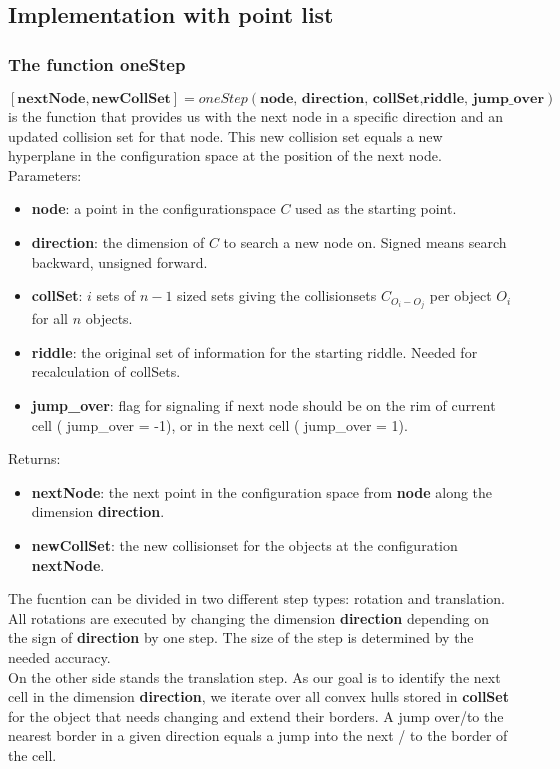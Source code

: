 \subsection{Implementation with point list}
\subsubsection{The function oneStep}
$[\textbf{nextNode}, \textbf{newCollSet} ]=oneStep(\textbf{node, direction, collSet,riddle, jump\_over})$ is the function that provides us with the next node in a specific direction and an updated collision set for that node. This new collision set equals a new hyperplane in the configuration space at the position of the next node.\\
Parameters:
\begin{itemize}
\item \textbf{node}: a point in the configurationspace $C$ used as the starting point.
\item \textbf{direction}: the dimension of $C$ to search a new node on. Signed means search backward, unsigned forward. 
\item \textbf{collSet}: $i$ sets of $n-1$ sized sets giving the collisionsets $C_{O_i-O_j}$ per object $O_i$ for all $n$ objects.
\item \textbf{riddle}: the original set of information for the starting riddle. Needed for recalculation of collSets.
\item \textbf{jump\_over}: flag for signaling if next node should be on the rim of current cell ( jump\_over = -1), or in the next cell ( jump\_over = 1).
\end{itemize}
Returns:
\begin{itemize}
\item \textbf{nextNode}: the next point in the configuration space from \textbf{node} along the dimension \textbf{direction}.
\item \textbf{newCollSet}: the new collisionset for the objects at the configuration \textbf{nextNode}.
\end{itemize}
The fucntion can be divided in two different step types: rotation and translation. \\
All rotations are executed by changing the dimension \textbf{direction}  depending on the sign of \textbf{direction} by one step. The size of the step is determined by the needed accuracy. \\
On the other side stands the translation step. As our goal is to identify the next cell in the dimension \textbf{direction}, we iterate over all convex hulls stored in \textbf{collSet} for the object that needs changing and extend their borders. A jump over/to the nearest border in a given direction equals a jump into the next / to the border of the cell.\\
